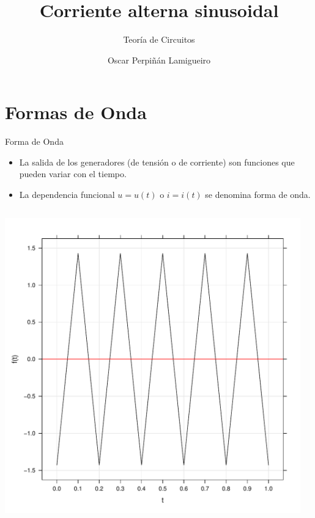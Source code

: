 \documentclass[aspectratio=169, usenames,svgnames,dvipsnames]{beamer}
\author{Oscar Perpiñán Lamigueiro}
\date{}
\title{Corriente alterna sinusoidal}
\subtitle{Teoría de Circuitos}
\begin{document}
\maketitle
\section{Formas de Onda}
\label{sec:orga0751a6}

\begin{frame}[label={sec:org61486dc}]{Forma de Onda}
\begin{itemize}
\item La salida de los generadores (de tensión o de corriente) son funciones que pueden variar con el tiempo.
\item La dependencia funcional \(u = u(t)\) o \(i = i(t)\) se denomina forma de onda.
\end{itemize}
\begin{columns}
\begin{column}{0.3\columnwidth}
\begin{center}
\includegraphics[width=.9\linewidth]{../figs/triangular_periodica.pdf}
\end{center}
\end{column}
\begin{column}{0.3\columnwidth}
\begin{center}

\end{center}
\end{column}
\end{columns}
\end{frame}
\end{document}
